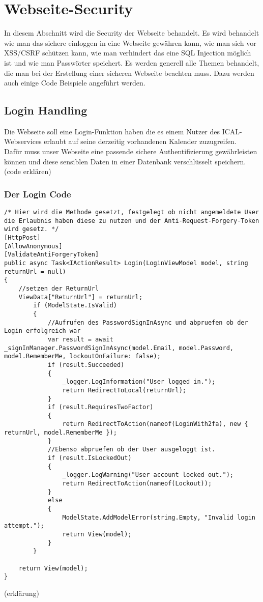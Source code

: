 \renewcommand{\theauthor}{Marcel Stering}
\chapter{Webseite-Security}
\label{sec:Security}
In diesem Abschnitt wird die Security der Webseite behandelt.
Es wird behandelt wie man das sichere einloggen in eine Webseite gewähren kann,
wie man sich vor XSS/CSRF schützen kann, wie man verhindert das eine SQL Injection
möglich ist und wie man Passwörter speichert. Es werden generell alle Themen behandelt, die man bei der Erstellung einer sicheren Webseite beachten muss. Dazu werden auch einige Code Beispiele angeführt werden.
\section{Login Handling}
\label{sec:Login}
Die Webseite soll eine Login-Funktion haben die es einem Nutzer des ICAL-Webservices erlaubt auf seine derzeitig vorhandenen Kalender zuzugreifen.\\Dafür muss unser Webseite eine passende sichere Authentifizierung gewährleisten können und diese sensiblen Daten in einer Datenbank verschlüsselt speichern. 
(code erklären)
\subsection{Der Login Code}
\label{sec:Login_Handling_Code}
\begin{lstlisting}
/* Hier wird die Methode gesetzt, festgelegt ob nicht angemeldete User die Erlaubnis haben diese zu nutzen und der Anti-Request-Forgery-Token wird gesetz. */
[HttpPost]
[AllowAnonymous]
[ValidateAntiForgeryToken]
public async Task<IActionResult> Login(LoginViewModel model, string returnUrl = null)
{
	//setzen der ReturnUrl
    ViewData["ReturnUrl"] = returnUrl;
        if (ModelState.IsValid)
        {
        	//Aufrufen des PasswordSignInAsync und abpruefen ob der Login erfolgreich war
            var result = await _signInManager.PasswordSignInAsync(model.Email, model.Password, model.RememberMe, lockoutOnFailure: false);
            if (result.Succeeded)
            {
                _logger.LogInformation("User logged in.");
                return RedirectToLocal(returnUrl);
            }
            if (result.RequiresTwoFactor)
            {
                return RedirectToAction(nameof(LoginWith2fa), new { returnUrl, model.RememberMe });
            }
            //Ebenso abpruefen ob der User ausgeloggt ist.
            if (result.IsLockedOut)
            {
                _logger.LogWarning("User account locked out.");
                return RedirectToAction(nameof(Lockout));
            }
            else
            {
                ModelState.AddModelError(string.Empty, "Invalid login attempt.");
                return View(model);
            }
        }

    return View(model);
}
\end{lstlisting}
(erklärung)

